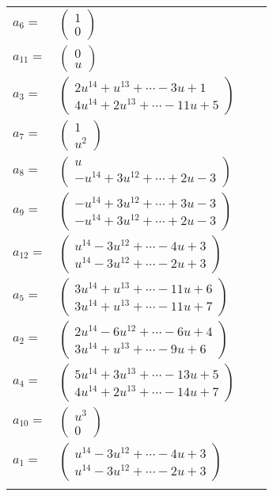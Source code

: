 \documentclass[1p]{elsarticle_modified}
\theoremstyle{definition}
\begin{document}
\begin{tabular}{m{7pt} m{180pt} m{7pt} m{180pt} }
\flushright $a_{6}=$&$\begin{pmatrix}1\\0\end{pmatrix}$ \\
\flushright $a_{11}=$&$\begin{pmatrix}0\\u\end{pmatrix}$ \\
\flushright $a_{3}=$&$\begin{pmatrix}2 u^{14}+u^{13}+\cdots-3 u+1\\4 u^{14}+2 u^{13}+\cdots-11 u+5\end{pmatrix}$ \\
\flushright $a_{7}=$&$\begin{pmatrix}1\\u^2\end{pmatrix}$ \\
\flushright $a_{8}=$&$\begin{pmatrix}u\\- u^{14}+3 u^{12}+\cdots+2 u-3\end{pmatrix}$ \\
\flushright $a_{9}=$&$\begin{pmatrix}- u^{14}+3 u^{12}+\cdots+3 u-3\\- u^{14}+3 u^{12}+\cdots+2 u-3\end{pmatrix}$ \\
\flushright $a_{12}=$&$\begin{pmatrix}u^{14}-3 u^{12}+\cdots-4 u+3\\u^{14}-3 u^{12}+\cdots-2 u+3\end{pmatrix}$ \\
\flushright $a_{5}=$&$\begin{pmatrix}3 u^{14}+u^{13}+\cdots-11 u+6\\3 u^{14}+u^{13}+\cdots-11 u+7\end{pmatrix}$ \\
\flushright $a_{2}=$&$\begin{pmatrix}2 u^{14}-6 u^{12}+\cdots-6 u+4\\3 u^{14}+u^{13}+\cdots-9 u+6\end{pmatrix}$ \\
\flushright $a_{4}=$&$\begin{pmatrix}5 u^{14}+3 u^{13}+\cdots-13 u+5\\4 u^{14}+2 u^{13}+\cdots-14 u+7\end{pmatrix}$ \\
\flushright $a_{10}=$&$\begin{pmatrix}u^3\\0\end{pmatrix}$ \\
\flushright $a_{1}=$&$\begin{pmatrix}u^{14}-3 u^{12}+\cdots-4 u+3\\u^{14}-3 u^{12}+\cdots-2 u+3\end{pmatrix}$\\&\end{tabular}
\end{document}
